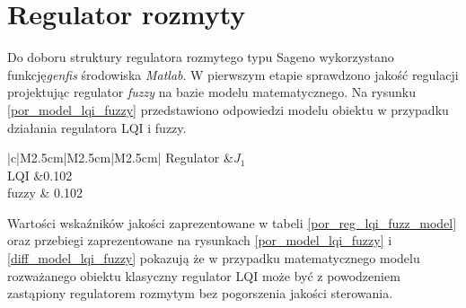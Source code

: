 \section{Regulator rozmyty}
Do doboru struktury regulatora rozmytego typu Sageno wykorzystano funkcję\textit{genfis} środowiska \textit{Matlab}. W pierwszym etapie sprawdzono jakość regulacji projektując regulator \textit{fuzzy} na bazie modelu matematycznego. Na rysunku  \ref{por_model_lqi_fuzzy} przedstawiono odpowiedzi modelu obiektu w przypadku działania regulatora LQI i fuzzy.\\
%
\begin{table}[h]
	\caption{Porównanie wska\'zników jakości regulator LQI i fuzzy dla modelu.}
	\label{por_reg_lqi_fuzz_model}
	\centering
	
	\begin{tabular}{|c|M{2.5cm}|M{2.5cm}|M{2.5cm}|}
		\hline
		Regulator &$J_1$\\
		\hline
		LQI &0.102\\
		\hline
		fuzzy & 0.102\\
		\hline
	\end{tabular}
\end{table}
\FloatBarrier
Wartości wska\'zników jakości zaprezentowane w tabeli \ref{por_reg_lqi_fuzz_model} oraz przebiegi zaprezentowane na rysunkach \ref{por_model_lqi_fuzzy} i \ref{diff_model_lqi_fuzzy} pokazują że w przypadku matematycznego modelu rozważanego obiektu klasyczny regulator LQI może być z powodzeniem zastąpiony regulatorem rozmytym bez pogorszenia jakości sterowania.

